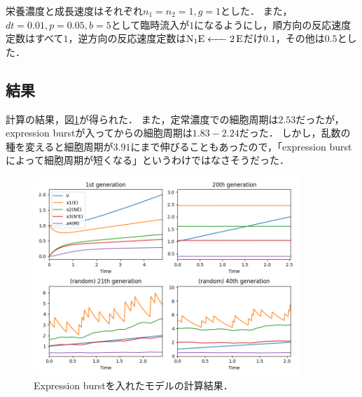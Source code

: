 \documentclass[a4paper,11pt]{jsarticle}
\begin{document}
栄養濃度と成長速度はそれぞれ$n_1=n_2=1, g=1$とした．
また，$dt=0.01, p=0.05, b=5$として臨時流入が$1$になるようにし，順方向の反応速度定数はすべて$1$，逆方向の反応速度定数は$\ce{N1E <- 2E}$だけ$0.1$，その他は$0.5$とした．

\subsection{結果}
計算の結果，図\ref{fig:burst}が得られた．
また，定常濃度での細胞周期は$2.53$だったが，expression burstが入ってからの細胞周期は$1.83-2.24$だった．
しかし，乱数の種を変えると細胞周期が$3.91$にまで伸びることもあったので，「expression burstによって細胞周期が短くなる」というわけではなさそうだった．

\begin{figure}[htbp]
  \centering
  \includegraphics[width=10cm]{burst.png}
  \caption{Expression burstを入れたモデルの計算結果．}
  \label{fig:burst}
\end{figure}
\end{document}
